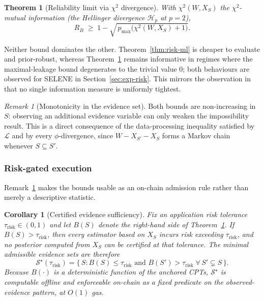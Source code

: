 \documentclass[journal]{IEEEtran}
\newtheorem{theorem}{Theorem}
\newtheorem{corollary}{Corollary}
\theoremstyle{definition}
\theoremstyle{remark}
\newtheorem{remark}{Remark}
\begin{document}
\begin{theorem}[Reliability limit via $\chi^2$ divergence]
\label{thm:risk-chi2}
With $\chi^2(W,X_S)$ the $\chi^2$-mutual information
(the Hellinger divergence $\mathcal{H}_p$ at $p=2$),
\[
  R_B \;\geq\;
  1-\sqrt{\,p_{\max}\bigl(\chi^2(W,X_S)+1\bigr)}.
\]
\end{theorem}

Neither bound dominates the other. Theorem~\ref{thm:risk-ml}
is cheaper to evaluate and prior-robust, whereas
Theorem~\ref{thm:risk-chi2} remains informative in regimes
where the maximal-leakage bound degenerates to the trivial
value $0$; both behaviours are observed for SELENE in
Section~\ref{sec:exp-risk}. This mirrors the observation
in~\cite{esposito2024lower} that no single information
measure is uniformly tightest.

\begin{remark}[Monotonicity in the evidence set]
\label{rem:monotone}
Both bounds are non-increasing in $S$: observing an
additional evidence variable can only weaken the
impossibility result. This is a direct consequence of the
data-processing inequality satisfied by $\mathcal{L}$ and
by every $\phi$-divergence, since
$W-X_{S'}-X_S$ forms a Markov chain whenever
$S\subseteq S'$.
\end{remark}

\subsubsection{Risk-gated execution}

Remark~\ref{rem:monotone} makes the bounds usable as an
on-chain admission rule rather than merely a descriptive
statistic.

\begin{corollary}[Certified evidence sufficiency]
\label{cor:gating}
Fix an application risk tolerance
$\tau_{\mathrm{risk}}\in(0,1)$ and let $B(S)$ denote the
right-hand side of Theorem~\ref{thm:risk-chi2}. If
$B(S)>\tau_{\mathrm{risk}}$, then \emph{every} estimator
based on $X_S$ incurs risk exceeding
$\tau_{\mathrm{risk}}$, and no posterior computed from
$X_S$ can be certified at that tolerance. The minimal
admissible evidence sets are therefore
\[
  \mathcal{S}^\star(\tau_{\mathrm{risk}})
  = \bigl\{\, S : B(S)\le\tau_{\mathrm{risk}}
    \text{ and } B(S')>\tau_{\mathrm{risk}}\;
    \forall\, S'\subsetneq S \,\bigr\}.
\]
Because $B(\cdot)$ is a deterministic function of the
anchored CPTs, $\mathcal{S}^\star$ is computable offline
and enforceable on-chain as a fixed predicate on the
observed-evidence pattern, at $O(1)$ gas.
\end{corollary}
\end{document}
